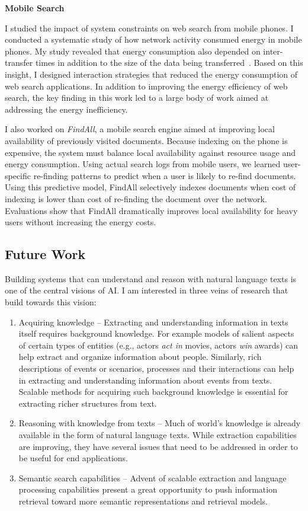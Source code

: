 \documentclass[a4paper,11pt,onecolumn]{article}
\begin{document}
{\bf Mobile Search}

I studied the impact of system constraints on web search from mobile phones. I conducted a systematic study of how network activity consumed energy in mobile phones. My study revealed that energy consumption also depended on inter-transfer times in addition to the size of the data being transferred~\cite{balasubramanian-imc09}. Based on this insight, I designed interaction strategies that reduced the energy consumption of web search applications. In addition to improving the energy efficiency of web search, the key finding in this work led to a large body of work aimed at addressing the energy inefficiency.

I also worked on {\em FindAll}, a mobile search engine aimed at improving local availability of previously visited documents. Because indexing on the phone is expensive, the system must balance local availability against resource usage and energy consumption. Using actual search logs from mobile users, we learned user-specific re-finding patterns to predict when a user is likely to re-find documents. Using this predictive model, FindAll selectively indexes documents when cost of indexing is lower than cost of re-finding the document over the network. Evaluations show that FindAll dramatically improves local availability for heavy users without increasing the energy costs.

\subsection*{Future Work}

Building systems that can understand and reason with natural language texts is one of the central visions of AI. 	 
I am interested in three veins of research that build towards this vision: 
\begin{enumerate}
\item Acquiring knowledge -- Extracting and understanding information in texts itself requires background knowledge. For example models of salient aspects of certain types of entities (e.g., actors {\em act in} movies, actors {\em win} awards) can help extract and organize information about people. Similarly, rich descriptions of events or scenarios, processes and their interactions can help in extracting and understanding information about events from texts. Scalable methods for acquiring such background knowledge is essential for extracting richer structures from text.  
\item Reasoning with knowledge from texts -- Much of world's knowledge is already available in the form of natural language texts. While extraction capabilities are improving, they have several issues that need to be addressed in order to be useful for end applications. 
\item Semantic search capabilities -- Advent of scalable extraction and language processing capabilities present a great opportunity to push information retrieval toward more semantic representations and retrieval models.
\end{enumerate}
\end{document}
